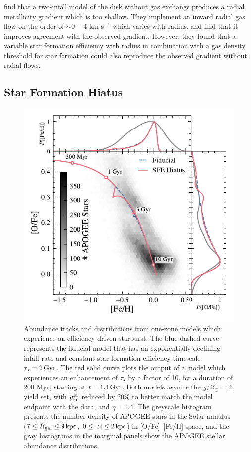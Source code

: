 \documentclass[twocolumn,twocolappendix,linenumbers]{aastex631}
\newcommand{\yZ}[1]{$y/Z_\odot=#1$}
\begin{document}
\citet{spitoni_effects_2011} find that a two-infall model of the disk without gas exchange produces a radial metallicity gradient which is too shallow. They implement an inward radial gas flow on the order of $\sim0-4$ km s$^{-1}$ which varies with radius, and find that it improves agreement with the observed gradient. However, they found that a variable star formation efficiency with radius in combination with a gas density threshold for star formation could also reproduce the observed gradient without radial flows.

\subsection{Star Formation Hiatus}
\label{sec:sfe-hiatus}

\begin{figure}
    \centering
    \includegraphics{figures/onezone_sfe_hiatus.pdf}
    \caption{Abundance tracks and distributions from one-zone models which experience an efficiency-driven starburst. The blue dashed curve represents the fiducial model that has an exponentially declining infall rate and constant star formation efficiency timescale $\tau_\star=2\,{\rm Gyr}$. The red solid curve plots the output of a model which experiences an enhancement of $\tau_\star$ by a factor of 10, for a duration of 200 Myr, starting at $t=1.4\,{\rm Gyr}$. Both models assume the \yZ{2} yield set, with $y_{\rm Fe}^{\rm Ia}$ reduced by 20\% to better match the model endpoint with the data, and $\eta=1.4$. The greyscale histogram presents the number density of APOGEE stars in the Solar annulus ($7\leq R_{\rm gal}\leq 9\,{\rm kpc}$, $0\leq|z|\leq2\,{\rm kpc}$) in [O/Fe]--[Fe/H] space, and the gray histograms in the marginal panels show the APOGEE stellar abundance distributions.}
    \label{fig:onezone-sfe-hiatus}
\end{figure}
\end{document}
